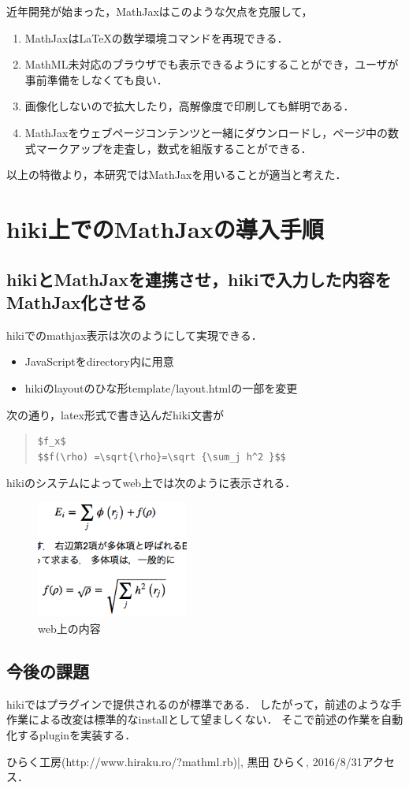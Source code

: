 \documentclass[10pt,a4j,twocolumn]{jsarticle}
\begin{document}
近年開発が始まった，MathJaxはこのような欠点を克服して，
\begin{enumerate}
\item MathJaxはLaTeXの数学環境コマンドを再現できる．
\item MathML未対応のブラウザでも表示できるようにすることができ，ユーザが事前準備をしなくても良い．
\item 画像化しないので拡大したり，高解像度で印刷しても鮮明である．
\item MathJaxをウェブページコンテンツと一緒にダウンロードし，ページ中の数式マークアップを走査し，数式を組版することができる．
\end{enumerate}
以上の特徴より，本研究ではMathJaxを用いることが適当と考えた．

\section{hiki上でのMathJaxの導入手順}
\subsection{hikiとMathJaxを連携させ，hikiで入力した内容をMathJax化させる}
hikiでのmathjax表示は次のようにして実現できる．
\begin{itemize}
\item JavaScriptをdirectory内に用意
\item hikiのlayoutのひな形template/layout.htmlの一部を変更
\end{itemize}
次の通り，latex形式で書き込んだhiki文書が
\begin{quote}\begin{verbatim}
$f_x$
$$f(\rho) =\sqrt{\rho}=\sqrt {\sum_j h^2 }$$
\end{verbatim}\end{quote}
hikiのシステムによってweb上では次のように表示される．


\begin{figure}[h]
  \centering
  \includegraphics[width=5cm]{Math_test3.png}
  \caption{web上の内容}
\end{figure}

\subsection{今後の課題}
hikiではプラグインで提供されるのが標準である．
したがって，前述のような手作業による改変は標準的なinstallとして望ましくない．
そこで前述の作業を自動化するpluginを実装する．

\begin{bibliography}{9}
 ひらく工房(http://www.hiraku.ro/?mathml.rb)|, 黒田 ひらく, 2016/8/31アクセス．
\end{bibliography}
\end{document}
